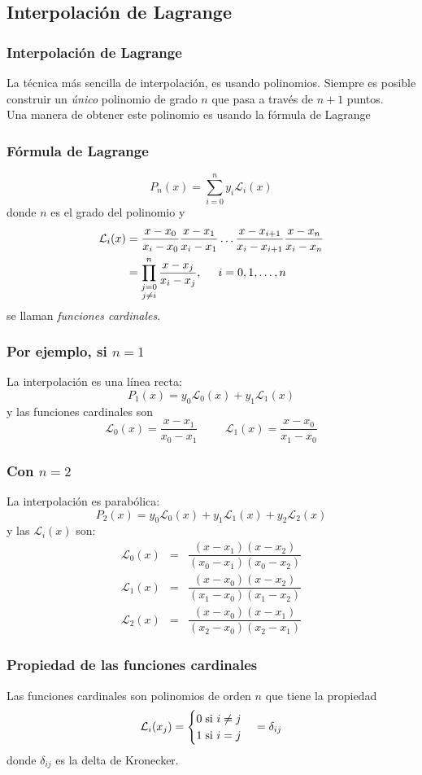 \subsection{Interpolación de Lagrange}
\begin{frame}
\frametitle{Interpolación de Lagrange}
La técnica más sencilla de interpolación, es usando polinomios. Siempre es posible construir un \emph{único} polinomio de grado $n$ que pasa a través de $n+1$ puntos.
\\
\medskip
Una manera de obtener este polinomio es usando la fórmula de Lagrange

\end{frame}
\begin{frame}
\frametitle{Fórmula de Lagrange}
\[ P_{n}(x) = \sum_{i=0}^{n} y_{i} \mathcal{L}_{i}(x)\]
donde $n$ es el grado del polinomio y
\[ \begin{split}
\mathcal{L}_{i}(x) &= \dfrac{x-x_{0}}{x_{i}-x_{0}} \dfrac{x-x_{1}}{x_{i}-x_{1}} \ldots \dfrac{x-x_{i+1}}{x_{i}-x_{i+1}} \dfrac{x-x_{n}}{x_{i}-x_{n}} \\
 &= \prod_{\substack{j=0 \\ j \neq i}}^{n} \dfrac{x-x_{j}}{x_{i}-x_{j}}, \hspace{0.5cm} i=0,1,\ldots,n
\end{split} \]
se llaman \emph{funciones cardinales}.
\end{frame}
\begin{frame}
\frametitle{Por ejemplo, si $n=1$}
La interpolación es una línea recta: 
\[P_{1}(x) = y_{0}\mathcal{L}_{0}(x) + y_{1} \mathcal{L}_{1}(x) \]
y las funciones cardinales son
\[ \mathcal{L}_{0}(x) = \dfrac{x-x_{1}}{x_{0}-x_{1}} \hspace{1cm} \mathcal{L}_{1}(x) = \dfrac{x-x_{0}}{x_{1}-x_{0}} \]
\end{frame}
\begin{frame}
\frametitle{Con $n=2$}
La interpolación es parabólica:
\[P_{2}(x) = y_{0}\mathcal{L}_{0}(x) + y_{1} \mathcal{L}_{1}(x) + y_{2} \mathcal{L}_{2}(x) \]
y las $\mathcal{L}_{i}(x)$ son:
\begin{eqnarray*}
\mathcal{L}_{0}(x) &=& \dfrac{(x-x_{1})(x-x_{2})}{(x_{0}-x_{1})(x_{0}-x_{2})} \\
\mathcal{L}_{1}(x) &=& \dfrac{(x-x_{0})(x-x_{2})}{(x_{1}-x_{0})(x_{1}-x_{2})} \\
\mathcal{L}_{2}(x) &=& \dfrac{(x-x_{0})(x-x_{1})}{(x_{2}-x_{0})(x_{2}-x_{1})} 
\end{eqnarray*}
\end{frame}
\begin{frame}
\frametitle{Propiedad de las funciones cardinales}
Las funciones cardinales son polinomios de orden $n$ que tiene la propiedad
\[ \mathcal{L}_{i} (x_{j}) = \begin{cases} 0 \hspace{0.1cm} \mbox{si } i \neq j \\ 
1 \hspace{0.1cm} \mbox{si } i = j \end{cases} = \delta_{ij} \]
donde $\delta_{ij}$ es la delta de Kronecker.
\end{frame}
